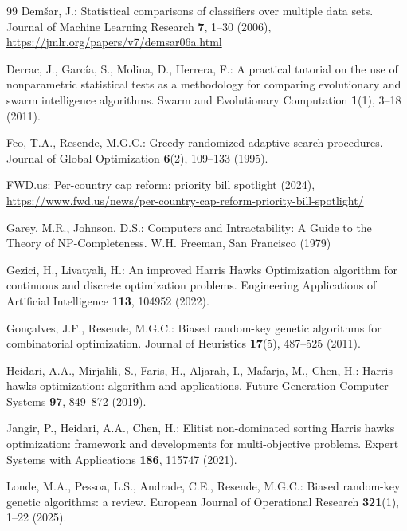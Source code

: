 \documentclass[runningheads]{llncs}
\begin{document}
\begin{thebibliography}{99}
Demšar, J.: Statistical comparisons of classifiers over multiple data sets. Journal of Machine Learning Research \textbf{7}, 1--30 (2006), \url{https://jmlr.org/papers/v7/demsar06a.html}

Derrac, J., García, S., Molina, D., Herrera, F.: A practical tutorial on the use of nonparametric statistical tests as a methodology for comparing evolutionary and swarm intelligence algorithms. Swarm and Evolutionary Computation \textbf{1}(1), 3--18 (2011). 

Feo, T.A., Resende, M.G.C.: Greedy randomized adaptive search procedures. Journal of Global Optimization \textbf{6}(2), 109--133 (1995). 

FWD.us: Per-country cap reform: priority bill spotlight (2024), \url{https://www.fwd.us/news/per-country-cap-reform-priority-bill-spotlight/}

Garey, M.R., Johnson, D.S.: Computers and Intractability: A Guide to the Theory of NP-Completeness. W.H. Freeman, San Francisco (1979)

Gezici, H., Livatyali, H.: An improved Harris Hawks Optimization algorithm for continuous and discrete optimization problems. Engineering Applications of Artificial Intelligence \textbf{113}, 104952 (2022). 

Gon\c{c}alves, J.F., Resende, M.G.C.: Biased random-key genetic algorithms for combinatorial optimization. Journal of Heuristics \textbf{17}(5), 487--525 (2011). 

Heidari, A.A., Mirjalili, S., Faris, H., Aljarah, I., Mafarja, M., Chen, H.: Harris hawks optimization: algorithm and applications. Future Generation Computer Systems \textbf{97}, 849--872 (2019). 

Jangir, P., Heidari, A.A., Chen, H.: Elitist non-dominated sorting Harris hawks optimization: framework and developments for multi-objective problems. Expert Systems with Applications \textbf{186}, 115747 (2021). 

Londe, M.A., Pessoa, L.S., Andrade, C.E., Resende, M.G.C.: Biased random-key genetic algorithms: a review. European Journal of Operational Research \textbf{321}(1), 1--22 (2025). 


\end{thebibliography}
\end{document}
